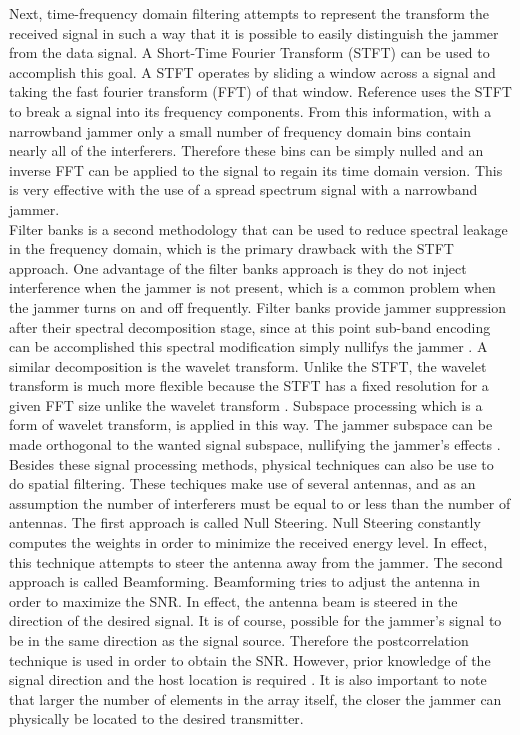 Next, time-frequency domain filtering attempts to represent the transform the received signal in such a way that it is possible to easily distinguish the jammer from the data signal.  A Short-Time Fourier Transform (STFT) can be used to accomplish this goal.  A STFT operates by sliding a window across a signal and taking the fast fourier transform (FFT) of that window. Reference \cite{12} uses the STFT to break a signal into its frequency components. From this information, with a narrowband jammer only a small number of frequency domain bins contain nearly all of the interferers.  Therefore these bins can be simply nulled and an inverse FFT can be applied to the signal to regain its time domain version.  This is very effective with the use of a spread spectrum signal with a narrowband jammer.\\

%
%

Filter banks is a second methodology that can be used to reduce spectral leakage in the frequency domain, which is the primary drawback with the STFT approach.  One advantage of the filter banks approach is they do not inject interference when the jammer is not present, which is a common problem when the jammer turns on and off frequently.  Filter banks provide jammer suppression after their spectral decomposition stage, since at this point sub-band encoding can be accomplished this spectral modification simply nullifys the jammer \cite{13}.  A similar decomposition is the wavelet transform.  Unlike the STFT, the wavelet transform is much more flexible because the STFT has a fixed resolution for a given FFT size unlike the wavelet transform \cite{TBD}.  Subspace processing which is a form of wavelet transform, is applied in this way.  The jammer subspace can be made orthogonal to the wanted signal subspace, nullifying the jammer's effects \cite{14}.\\

Besides these signal processing methods, physical techniques can also be use to do spatial filtering.  These techiques make use of several antennas, and as an assumption the number of interferers must be equal to or less than the number of antennas.  The first approach is called Null Steering.  Null Steering constantly computes the weights in order to minimize the received energy level. In effect, this technique attempts to steer the antenna away from the jammer.  The second approach is called Beamforming.  Beamforming tries to adjust the antenna in order to maximize the SNR. In effect, the antenna beam is steered in the direction of the desired signal.  It is of course, possible for the jammer's signal to be in the same direction as the signal source. Therefore the postcorrelation technique is used in order to obtain the SNR. However, prior knowledge of the signal direction and the host location is required \cite{kandangath}.  It is also important to note that larger the number of elements in the array itself, the closer the jammer can physically be located to the desired transmitter.\\


